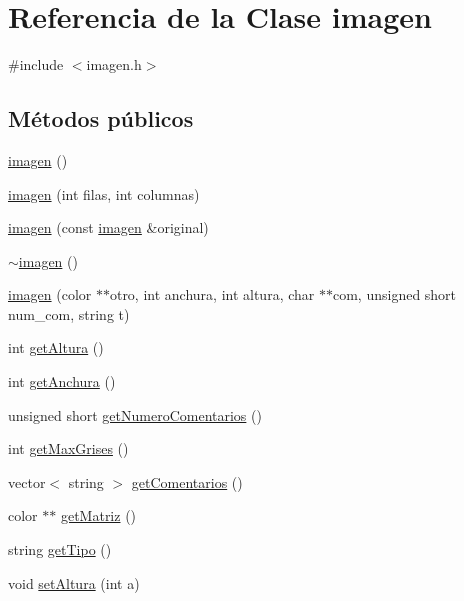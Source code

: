 \hypertarget{classimagen}{}\section{Referencia de la Clase imagen}
\label{classimagen}


{\ttfamily \#include $<$imagen.\+h$>$}

\subsection*{Métodos públicos}
\begin{DoxyCompactItemize}
\item 
\mbox{\hyperlink{classimagen_a3a8a8d82546e8fc325c385e2dc4b00e6}{imagen}} ()
\item 
\mbox{\hyperlink{classimagen_aeec0ca5171e8a1eac8c20c31e74d538d}{imagen}} (int filas, int columnas)
\item 
\mbox{\hyperlink{classimagen_a4e891c5bfbe09261dc02660879e37bea}{imagen}} (const \mbox{\hyperlink{classimagen}{imagen}} \&original)
\item 
\mbox{\hyperlink{classimagen_a1efdf77f6e6af0e528f0b7e8665d0060}{$\sim$imagen}} ()
\item 
\mbox{\hyperlink{classimagen_a61cb9de8b7733a8f2e53a37e45105785}{imagen}} (color $\ast$$\ast$otro, int anchura, int altura, char $\ast$$\ast$com, unsigned short num\+\_\+com, string t)
\item 
int \mbox{\hyperlink{classimagen_aae8a3fc5fd7e983c8892b89e6d0473ea}{get\+Altura}} ()
\item 
int \mbox{\hyperlink{classimagen_aacfbb6e3b502068e9d18d36f730c60d3}{get\+Anchura}} ()
\item 
unsigned short \mbox{\hyperlink{classimagen_a47971a2dd948cd32e913a0744e24ae9f}{get\+Numero\+Comentarios}} ()
\item 
int \mbox{\hyperlink{classimagen_a89ffc85c3f945b94edc202afac6bf315}{get\+Max\+Grises}} ()
\item 
vector$<$ string $>$ \mbox{\hyperlink{classimagen_ac4d0f4eb1e005e05ff6df48ad5f8b18d}{get\+Comentarios}} ()
\item 
color $\ast$$\ast$ \mbox{\hyperlink{classimagen_ab8ddad8f0c6d8c8c66d9f773e2c0e98b}{get\+Matriz}} ()
\item 
string \mbox{\hyperlink{classimagen_aef9dea6dc4d170ecc535edb48159113d}{get\+Tipo}} ()
\item 
void \mbox{\hyperlink{classimagen_ac1cfc220563159e05f7cd0c46bd1d131}{set\+Altura}} (int a)
\item 
$$
\end{DoxyCompactItemize}
